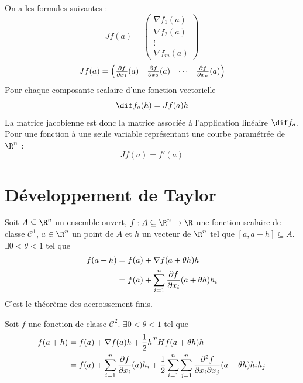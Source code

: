 \begin{myform}
	On a les formules suivantes :
	\[ Jf(a) =
	\begin{pmatrix} \nabla f_1(a) \\ \nabla f_2(a) \\ \vdots \\ \nabla f_m(a)
	\end{pmatrix} \]
	\[ Jf(a) =
	\begin{pmatrix} \frac{\partial f}{\partial x_1}(a) & \frac{\partial f}{\partial x_2}(a) & \cdots & \frac{\partial f}{\partial x_n}(a)
	\end{pmatrix} \]
	Pour chaque composante scalaire d'une fonction vectorielle
	\[ \dif f_a(h) = Jf(a) h \]
	La matrice jacobienne est donc la matrice associée à l'application linéaire $\dif f_a$.
	Pour une fonction à une seule variable représentant une courbe paramétrée de $\R^n$ :
	\[ Jf(a) = f'(a) \]
\end{myform}


\section{Développement de Taylor}

\begin{myform}
	Soit $A \subseteq \R^n$ un ensemble ouvert, $f : A \subseteq \R^n \to \R$ une fonction scalaire de classe $\mathcal{C}^1$, $a \in \R^n$ un point de $A$ et $h$ un vecteur de $\R^n$ tel que $[a, a+h] \subseteq A$. $\exists 0 < \theta < 1$ tel que
	\begin{align*}
		f(a+h) & = f(a) + \nabla f(a+\theta h)h \\
		& = f(a) + \sum_{i =1}^n \frac{\partial f}{\partial x_i} (a+\theta h)h_i
	\end{align*}
	C'est le théorème des accroissement finis.
\end{myform}

\begin{myform}
	Soit $f$ une fonction de classe $\mathcal{C}^2$.
	$\exists 0 < \theta < 1$ tel que
	\begin{align*} f(a+h) & = f(a) + \nabla f(a) h + \frac12 h^T Hf(a+\theta h) h \\
		& = f(a) + \sum_{i=1}^n \frac{\partial f}{\partial x_i}(a)h_i + \frac12 \sum_{i=1}^n \sum_{j=1}^n \frac{\partial^2 f}{\partial x_i \partial x_j} (a+ \theta h) h_i h_j
	\end{align*}
\end{myform}

